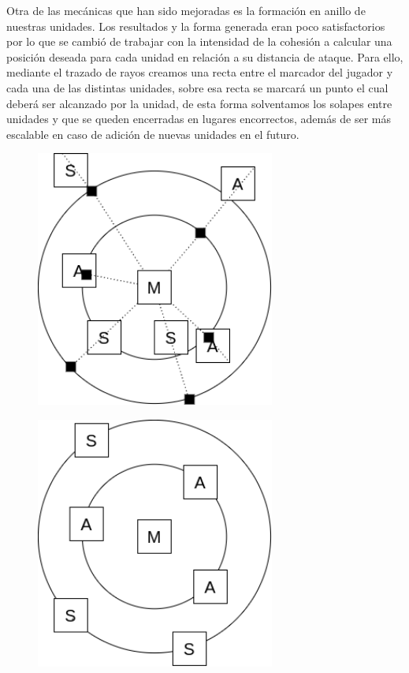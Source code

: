 Otra de las mecánicas que han sido mejoradas es la formación en anillo de nuestras unidades. Los resultados
y la forma generada eran poco satisfactorios por lo que se cambió de trabajar con la intensidad de la cohesión
a calcular una posición deseada para cada unidad en relación a su distancia de ataque. Para ello, mediante el
trazado de rayos creamos una recta entre el marcador del jugador y cada una de las distintas unidades, sobre esa
recta se marcará un punto el cual deberá ser alcanzado por la unidad, de esta forma solventamos los solapes entre
unidades y que se queden encerradas en lugares encorrectos, además de ser más escalable en caso de adición de
nuevas unidades en el futuro.

\begin{figure}[ht]
\centering
\begin{minipage}[c]{0.42\linewidth}
	\hspace{9mm}
	\includegraphics[width=0.7\textwidth]{imagenes/diario_desarrollo/anillo2.png} \\
	\label{anillo2}
\end{minipage}
\begin{minipage}[c]{0.42\linewidth}
	\hspace{9mm}
	\includegraphics[width=0.7\textwidth]{imagenes/diario_desarrollo/anillo3.png} \\

\end{minipage}
\end{figure}
